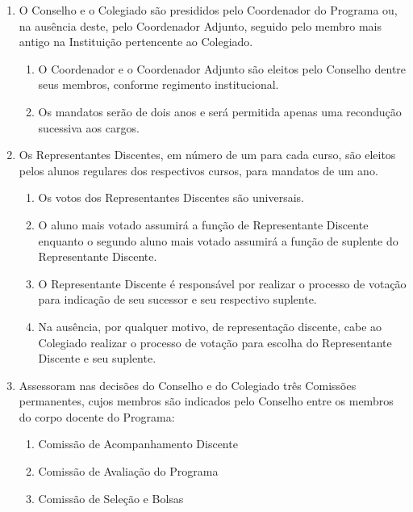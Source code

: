\documentclass{article}
\newcommand{\grupoMenor}{Colegiado\xspace}
\newcommand{\grupoMaior}{Conselho\xspace}
\begin{document}
\begin{enumerate}
	\item O \grupoMaior e o \grupoMenor são presididos pelo Coordenador do Programa ou, na ausência deste, pelo Coordenador Adjunto, seguido pelo membro mais antigo na Instituição pertencente ao \grupoMenor.
	\begin{enumerate}
		\item O Coordenador e o Coordenador Adjunto são eleitos pelo \grupoMaior dentre seus membros, conforme regimento institucional.
		\item Os mandatos serão de dois anos e será permitida apenas uma recondução sucessiva aos cargos.
	\end{enumerate}

	\item Os Representantes Discentes, em número de um para cada curso, são eleitos pelos alunos regulares dos respectivos cursos, para mandatos de um ano.
	\begin{enumerate}
		\item Os votos dos Representantes Discentes são universais.
		\item O aluno mais votado assumirá a função de Representante Discente enquanto o segundo aluno mais votado assumirá a função de suplente do Representante Discente.
		\item O Representante Discente é responsável por realizar o processo de votação para indicação de seu sucessor e seu respectivo suplente.
		\item Na ausência, por qualquer motivo, de representação discente, cabe ao \grupoMenor realizar o processo de votação para escolha do Representante Discente e seu suplente.
	\end{enumerate}	

	\item Assessoram nas decisões do \grupoMaior e do \grupoMenor três Comissões permanentes, cujos membros são indicados pelo \grupoMaior entre os membros do corpo docente do Programa:
	\begin{enumerate}[label=\Roman*]
		\item Comissão de Acompanhamento Discente
		\item Comissão de Avaliação do Programa
		\item Comissão de Seleção e Bolsas
	\end{enumerate}

\end{enumerate}
\end{document}
